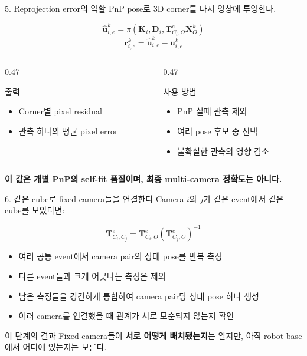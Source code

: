 \documentclass[aspectratio=169,11pt]{beamer}
\newcommand{\T}[2]{\mathbf T_{#1,#2}}
\begin{document}
\begin{frame}{5. Reprojection error의 역할}
  PnP pose로 3D corner를 다시 영상에 투영한다.

  \[
    \widehat{\mathbf u}_{i,e}^{k}
    =\pi\!\left(\mathbf K_i,\mathbf D_i,
      \T{C_i}{O}^{e}\mathbf X_O^k\right)
  \]
  \[
    \mathbf r_{i,e}^{k}
    =\widehat{\mathbf u}_{i,e}^{k}-\mathbf u_{i,e}^{k}
  \]

  \begin{columns}[T]
    \begin{column}{0.47\textwidth}
      \begin{block}{출력}
        \begin{itemize}
          \item Corner별 pixel residual
          \item 관측 하나의 평균 pixel error
        \end{itemize}
      \end{block}
    \end{column}
    \begin{column}{0.47\textwidth}
      \begin{block}{사용 방법}
        \begin{itemize}
          \item PnP 실패 관측 제외
          \item 여러 pose 후보 중 선택
          \item 불확실한 관측의 영향 감소
        \end{itemize}
      \end{block}
    \end{column}
  \end{columns}

  \vfill
  \centering
  \textbf{이 값은 개별 PnP의 self-fit 품질이며, 최종 multi-camera 정확도는 아니다.}
\end{frame}

\begin{frame}{6. 같은 cube로 fixed camera들을 연결한다}
  Camera $i$와 $j$가 같은 event에서 같은 cube를 보았다면:

  \[
    \T{C_i}{C_j}^{e}
    =\T{C_i}{O}^{e}
     \left(\T{C_j}{O}^{e}\right)^{-1}
  \]

  \begin{itemize}
    \item 여러 공통 event에서 camera pair의 상대 pose를 반복 측정
    \item 다른 event들과 크게 어긋나는 측정은 제외
    \item 남은 측정들을 강건하게 통합하여 camera pair당 상대 pose 하나 생성
    \item 여러 camera를 연결했을 때 관계가 서로 모순되지 않는지 확인
  \end{itemize}

  \vfill
  \begin{block}{이 단계의 결과}
    Fixed camera들이 \textbf{서로 어떻게 배치됐는지}는 알지만, 아직 robot base에서 어디에 있는지는 모른다.
  \end{block}
\end{frame}
\end{document}
